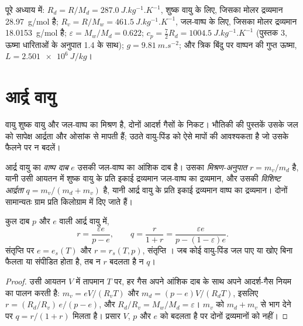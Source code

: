पूरे अध्याय में: $R_d = R/M_d = \qty{287.0}{J.kg^{-1}.K^{-1}}$, शुष्क वायु के लिए, जिसका मोलर द्रव्यमान \qty{28.97}{g/mol} है;
$R_v = R/M_w = \qty{461.5}{J.kg^{-1}.K^{-1}}$, जल-वाष्प के लिए, जिसका मोलर द्रव्यमान \qty{18.0153}{g/mol} है;
$\varepsilon = M_w/M_d = 0.622$; $c_p = \tfrac72 R_d =
\qty{1004.5}{J.kg^{-1}.K^{-1}}$ (पुस्तक 3, ऊष्मा धारिताओं के अनुपात 1.4 के साथ);
$g = \qty{9.81}{m.s^{-2}}$; और त्रिक बिंदु पर वाष्पन की गुप्त ऊष्मा,
$L = \qty{2.501e6}{J/kg}$।

\section{आर्द्र वायु}\label{sec:b2:atmospheric-thermodynamics:moist-air}

वायु शुष्क वायु और जल-वाष्प का मिश्रण है, दोनों आदर्श गैसों के निकट। भौतिकी की पुस्तकें
उसके जल को सापेक्ष आर्द्रता और ओसांक से मापती हैं; उठते वायु-पिंड को ऐसे मापों की आवश्यकता है
जो उसके फैलने पर न बदलें।

\begin{definition}[वाष्प दाब; मिश्रण-अनुपात; विशिष्ट आर्द्रता]\label{def:b2:atmospheric-thermodynamics:moist-air}
आर्द्र वायु का \emph{वाष्प दाब} $e$ उसकी जल-वाष्प का आंशिक दाब
है। उसका \emph{मिश्रण-अनुपात} $r = m_v/m_d$ है, यानी उसी आयतन में शुष्क वायु के प्रति इकाई द्रव्यमान
जल-वाष्प का द्रव्यमान, और उसकी \emph{विशिष्ट
आर्द्रता} $q = m_v/(m_d + m_v)$ है, यानी आर्द्र वायु के प्रति इकाई द्रव्यमान
वाष्प का द्रव्यमान। दोनों सामान्यतः ग्राम प्रति किलोग्राम में दिए जाते हैं।
\end{definition}

\begin{proposition}[आर्द्रता के चर]\label{prop:b2:atmospheric-thermodynamics:humidity}
कुल दाब $p$ और  $e$ वाली आर्द्र वायु में,
\[
  r = \frac{\varepsilon e}{p - e}, \qquad q = \frac{r}{1 + r} = \frac{\varepsilon e}{p - (1 -
  \varepsilon)e} .
\]
संतृप्ति पर $e = e_s(T)$ और $r = r_s(T, p)$, संतृप्ति । जब कोई वायु-पिंड जल पाए या खोए बिना
फैलता या संपीडित होता है, तब न $r$ बदलता है न $q$।
\end{proposition}

\begin{proof}
उसी आयतन $V$ में तापमान $T$ पर, हर गैस अपने आंशिक दाब के साथ अपने आदर्श-गैस नियम का पालन करती है:
$m_v = eV/(R_vT)$ और $m_d = (p - e)V/(R_dT)$, इसलिए $r = (R_d/R_v)\,e/(p - e)$,
और $R_d/R_v = M_w/M_d = \varepsilon$। $m_v$ को $m_d + m_v$ से भाग देने पर $q = r/(1 + r)$ मिलता है।
प्रसार $V$, $p$ और $e$ को बदलता है पर दोनों द्रव्यमानों को नहीं।
\end{proof}

